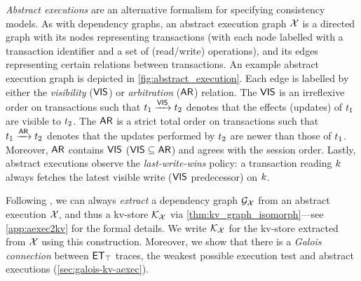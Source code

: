 

\emph{Abstract executions} \cite{ev_transactions,framework-concur} are an alternative formalism for specifying consistency models. 
As with dependency graphs, an abstract execution graph $\mathcal{X}$
is a directed graph with its nodes representing transactions (with each node labelled with a transaction identifier and a set of (read/write) operations), 
and its edges representing certain relations between transactions. 
An example abstract execution graph is depicted in \cref{fig:abstract_execution}. 
Each edge is labelled by either the \emph{visibility} ($\mathsf{VIS}$) or \emph{arbitration} ($\mathsf{AR}$) relation. 
The $\mathsf{VIS}$ is an irreflexive order on transactions such that $t_1 \xrightarrow{\mathsf{VIS}} t_2$ denotes that the effects (updates) of $t_1$ are visible to $t_2$. 
The $\mathsf{AR}$ is a strict total order on transactions such that $t_1 \xrightarrow{\mathsf{AR}} t_2$ denotes that the updates performed by $t_2$ are newer than those of $t_1$. 
Moreover, $\mathsf{AR}$ contains $\mathsf{VIS}$ ($\mathsf{VIS} \subseteq \mathsf{AR}$) and agrees with the session order.
Lastly, abstract executions observe the \emph{last-write-wins} policy: 
a transaction reading $k$ always fetches the latest visible write ($\mathsf{VIS}$ predecessor) on $k$.

Following \cite{laws}, we can always \emph{extract} a dependency graph $\mathcal{G}_{\mathcal{X}}$ from an abstract execution $\mathcal{X}$, and thus a kv-store $\mathcal{K}_{\mathcal{X}}$ via \cref{thm:kv_graph_isomorph}---see \cref{app:aexec2kv} for the formal details.
We write  $\mathcal{K}_{\mathcal{X}}$ for the kv-store extracted from $\mathcal{X}$ using this construction.  
Moreover, we show that there is a \emph{Galois connection}
between $\mathsf{ET}_{\top}$ traces, the weakest possible execution test and abstract executions (\cref{sec:galois-kv-aexec}).

